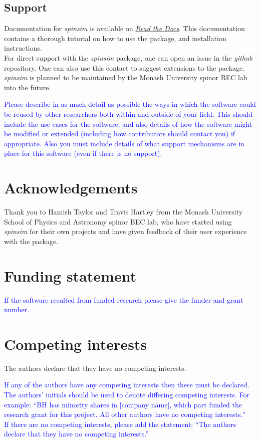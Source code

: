 \documentclass{jors}
\begin{document}
	\subsection*{Support}
		Documentation for \emph{spinsim} is available on \href{https://spinsim.readthedocs.io/en/latest/}{\emph{Read the Docs}}. This documentation contains a thorough tutorial on how to use the package, and installation instructions.\\
		
		For direct support with the \emph{spinsim} package, one can open an issue in the \emph{github} repository. One can also use this contact to suggest extensions to the package. \emph{spinsim} is planned to be maintained by the Monash University spinor BEC lab into the future.


\textcolor{blue}{Please describe in as much detail as possible the ways in which the software could be reused by other researchers both within and outside of your field. This should include the use cases for the software, and also details of how the software might be modified or extended (including how contributors should contact you) if appropriate. Also you must include details of what support mechanisms are in place for this software (even if there is no support).}

\section*{Acknowledgements}

Thank you to Hamish Taylor and Travis Hartley from the Monash University School of Physics and Astronomy spinor BEC lab, who have started using \emph{spinsim} for their own projects and have given feedback of their user experience with the package.

\section*{Funding statement}

\textcolor{blue}{If the software resulted from funded research please give the funder and grant number.}

\section*{Competing interests}

The authors declare that they have no competing interests.

\textcolor{blue}{If any of the authors have any competing interests then these must be declared. The authors’ initials should be used to denote differing competing interests. For example: “BH has minority shares in [company name], which part funded the research grant for this project. All other authors have no competing interests." \\
If there are no competing interests, please add the statement:
“The authors declare that they have no competing interests.” }
\end{document}
